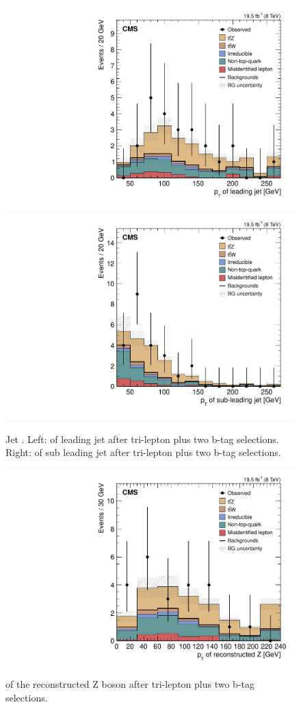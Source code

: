\begin{figure}[h]
\begin{center}
\includegraphics[width=0.48\linewidth]{Figs/Plots_PreSelections/hJ1Pt_3L2b.pdf}
\includegraphics[width=0.48\linewidth]{Figs/Plots_PreSelections/hJ2Pt_3L2b.pdf}
\caption{\label{fig:JPt_3L2b}
Jet \pt . Left: \pt of leading jet after tri-lepton plus two b-tag selections. Right: \pt of sub leading jet after tri-lepton plus two b-tag selections.
}
\end{center}
\end{figure}


\begin{figure}[h]
\begin{center}
\includegraphics[width=0.48\linewidth]{Figs/Plots_PreSelections/hZPt_3L2b.pdf}
\caption{\label{fig:hzpt_3L2b}
\pt of the reconstructed Z boson after tri-lepton plus two b-tag selections.
}
\end{center}
\end{figure}

\clearpage

